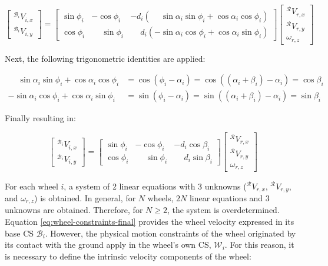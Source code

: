 \documentclass[11pt,a4paper]{article}
\newcommand{\frameR}{\mathcal{R}}
\newcommand{\frameBi}{\mathcal{B}_i}
\newcommand{\frameWi}{\mathcal{W}_i}
\begin{document}
\[
    \begin{bmatrix}
        {}^{\frameBi}V_{i,x} \\
        {}^{\frameBi}V_{i,y}
    \end{bmatrix} = \begin{bmatrix}
        \sin\phi_i & -\cos\phi_i           & -d_i(\phantom{-}\sin\alpha_i\sin\phi_i + \cos\alpha_i\cos\phi_i) \\
        \cos\phi_i & \phantom{-}\sin\phi_i & \phantom{-}d_i(-\sin\alpha_i\cos\phi_i + \cos\alpha_i\sin\phi_i)
    \end{bmatrix} \begin{bmatrix}
        {}^{\frameR}V_{r,x} \\
        {}^{\frameR}V_{r,y} \\
        \omega_{r,z}
    \end{bmatrix}
\]

Next, the following trigonometric identities are applied:

\[
    \begin{aligned}
        \phantom{-}\sin\alpha_i\sin\phi_i + \cos\alpha_i\cos\phi_i & = \cos(\phi_i - \alpha_i) = \cos((\alpha_i + \beta_i) - \alpha_i) = \cos\beta_i \\
        -\sin\alpha_i\cos\phi_i + \cos\alpha_i\sin\phi_i           & = \sin(\phi_i - \alpha_i) = \sin((\alpha_i + \beta_i) - \alpha_i) = \sin\beta_i
    \end{aligned}
\]

Finally resulting in:

\begin{equation}
    \begin{bmatrix}
        {}^{\frameBi}V_{i,x} \\
        {}^{\frameBi}V_{i,y}
    \end{bmatrix} = \begin{bmatrix}
        \sin\phi_i & -\cos\phi_i           & -d_i\cos\beta_i           \\
        \cos\phi_i & \phantom{-}\sin\phi_i & \phantom{-}d_i\sin\beta_i
    \end{bmatrix} \begin{bmatrix}
        {}^\frameR V_{r,x} \\
        {}^\frameR V_{r,y} \\
        \omega_{r,z}
    \end{bmatrix}
    \label{eq:wheel-constraints-final}
\end{equation}

For each wheel \(i\), a system of 2 linear equations with 3 unknowns (\({}^\frameR V_{r,x}\), \({}^\frameR V_{r,y}\), and \(\omega_{r,z}\)) is obtained. In general, for \(N\) wheels, \(2N\) linear equations and 3 unknowns are obtained. Therefore, for \(N \ge 2\), the system is overdetermined. Equation \ref{eq:wheel-constraints-final} provides the wheel velocity expressed in its base CS \(\frameBi\). However, the physical motion constraints of the wheel originated by its contact with the ground apply in the wheel's own CS, \(\frameWi\). For this reason, it is necessary to define the intrinsic velocity components of the wheel:
\end{document}
